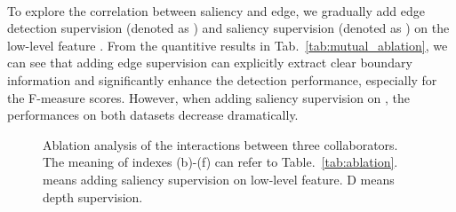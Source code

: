 \documentclass[runningheads]{llncs}
\begin{document}
\\
To explore the correlation between saliency and edge, we gradually add edge detection supervision (denoted as ) and saliency supervision (denoted as ) on the low-level feature .
From the quantitive results in Tab.~\ref{tab:mutual_ablation}, we can see that adding edge supervision can explicitly extract clear boundary information and significantly enhance the detection performance, especially for the F-measure scores.
However, when adding saliency supervision on , the performances on both datasets decrease dramatically.
\begin{wrapfigure}{r}{0.52\textwidth}
\begin{minipage}[t]{0.52\textwidth}
\vspace{0.15cm}
	\begin{minipage}[t]{1\textwidth}
  \centering
  \vspace{-1.1cm}
     \makeatletter{}\makeatother\caption{Ablation analysis of the interactions between three collaborators. The meaning of indexes (b)-(f) can refer to Table.~\ref{tab:ablation}.  means adding saliency supervision on low-level feature. D means depth supervision.}
\vspace{0.25cm}
\end{minipage}
\end{minipage}
\end{wrapfigure}
\end{document}
